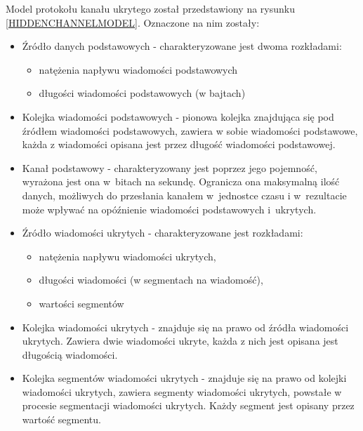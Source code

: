 \documentclass[a4paper, twoside, 12pt]{report}
\begin{document}
    Model protokołu kanału ukrytego został przedstawiony na rysunku \ref{HIDDENCHANNELMODEL}.
    Oznaczone na nim zostały:
    \begin{itemize}
        \item Źródło danych podstawowych - charakteryzowane jest dwoma rozkładami:
            \begin{itemize}
                \item natężenia napływu wiadomości podstawowych
                \item długości wiadomości podstawowych (w bajtach)
            \end{itemize}
        \item Kolejka wiadomości podstawowych - pionowa kolejka znajdująca się pod
    źródłem wiadomości podstawowych, zawiera w sobie wiadomości podstawowe,
    każda z wiadomości opisana jest przez długość wiadomości podstawowej.
        \item Kanał podstawowy - charakteryzowany jest
    poprzez jego pojemność, wyrażona jest ona w~bitach na sekundę. Ogranicza ona
    maksymalną ilość danych, możliwych do przesłania kanałem w~jednostce czasu i
    w~rezultacie może wpływać na opóźnienie wiadomości podstawowych i~ukrytych.
        \item Źródło wiadomości ukrytych - charakteryzowane jest rozkładami:
            \begin{itemize}
                \item natężenia napływu wiadomości ukrytych,
                \item długości wiadomości (w segmentach na wiadomość),
                \item wartości segmentów
            \end{itemize}
        \item Kolejka wiadomości ukrytych - znajduje się na prawo od źródła wiadomości ukrytych.
            Zawiera dwie wiadomości ukryte, każda z nich jest opisana jest długością wiadomości.
        \item Kolejka segmentów wiadomości ukrytych - znajduje się na prawo od kolejki
            wiadomości ukrytych, zawiera segmenty wiadomości ukrytych, powstałe w procesie
            segmentacji wiadomości ukrytych. Każdy segment jest opisany przez wartość segmentu.
    \end{itemize}
\end{document}
